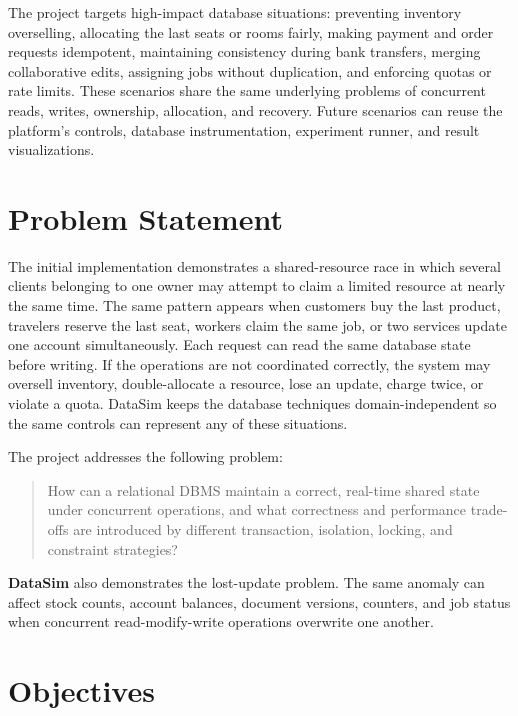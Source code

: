 \documentclass[12pt,a4paper]{article}
\newcommand{\datasim}{\textbf{DataSim}}
\begin{document}
The project targets high-impact database situations: preventing inventory overselling, allocating the last seats or rooms fairly, making payment and order requests idempotent, maintaining consistency during bank transfers, merging collaborative edits, assigning jobs without duplication, and enforcing quotas or rate limits. These scenarios share the same underlying problems of concurrent reads, writes, ownership, allocation, and recovery. Future scenarios can reuse the platform's controls, database instrumentation, experiment runner, and result visualizations.

\section{Problem Statement}

The initial implementation demonstrates a shared-resource race in which several clients belonging to one owner may attempt to claim a limited resource at nearly the same time. The same pattern appears when customers buy the last product, travelers reserve the last seat, workers claim the same job, or two services update one account simultaneously. Each request can read the same database state before writing. If the operations are not coordinated correctly, the system may oversell inventory, double-allocate a resource, lose an update, charge twice, or violate a quota. DataSim keeps the database techniques domain-independent so the same controls can represent any of these situations.

The project addresses the following problem:

\begin{quote}
How can a relational DBMS maintain a correct, real-time shared state under concurrent operations, and what correctness and performance trade-offs are introduced by different transaction, isolation, locking, and constraint strategies?
\end{quote}

\datasim{} also demonstrates the lost-update problem. The same anomaly can affect stock counts, account balances, document versions, counters, and job status when concurrent read-modify-write operations overwrite one another.

\section{Objectives}
\end{document}
